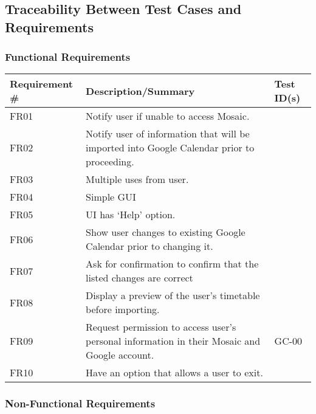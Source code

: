 \documentclass[12pt, titlepage]{article}
\begin{document}
\subsection{Traceability Between Test Cases and Requirements}

\subsubsection{Functional Requirements}
\begin{tabular}{ |p{3cm}|p{8cm}|p{2cm}| }
\hline Requirement #  &Description/Summary& Test ID(s) \\
\toprule
FR01 & Notify user if unable to access Mosaic. & \\
FR02 & Notify user of information that will be imported into Google Calendar prior to proceeding. & \\
FR03 & Multiple uses from user. &\\
FR04 & Simple GUI & \\
FR05 & UI has ‘Help’ option. & \\
FR06 & Show user changes to existing Google Calendar prior to changing it. & \\
FR07 & Ask for conﬁrmation to conﬁrm that the listed changes are correct & \\
FR08 & Display a preview of the user’s timetable before importing. & \\
FR09 & Request permission to access user’s personal information in their Mosaic and Google account. & GC-00\\
FR10 & Have an option that allows a user to exit. & \\
\bottomrule
\end{tabular}

\subsubsection{Non-Functional Requirements}
\end{document}
